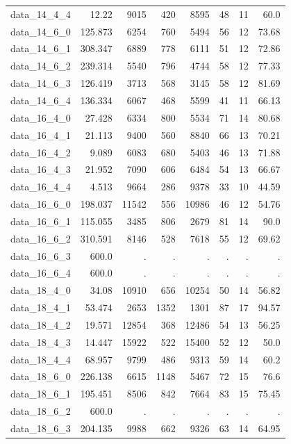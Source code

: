 \documentclass[preprint,12pt,authoryear]{elsarticle}
\begin{document}
\begin{table}[h!]
{\begin{tabular}{rrrrrrrr}
  data\_14\_4\_4 & 12.22 & 9015 & 420 & 8595 & 48 & 11 & 60.0 \\
  data\_14\_6\_0 & 125.873 & 6254 & 760 & 5494 & 56 & 12 & 73.68 \\
  data\_14\_6\_1 & 308.347 & 6889 & 778 & 6111 & 51 & 12 & 72.86 \\
  data\_14\_6\_2 & 239.314 & 5540 & 796 & 4744 & 58 & 12 & 77.33 \\
  data\_14\_6\_3 & 126.419 & 3713 & 568 & 3145 & 58 & 12 & 81.69 \\
  data\_14\_6\_4 & 136.334 & 6067 & 468 & 5599 & 41 & 11 & 66.13 \\
  data\_16\_4\_0 & 27.428 & 6334 & 800 & 5534 & 71 & 14 & 80.68 \\
  data\_16\_4\_1 & 21.113 & 9400 & 560 & 8840 & 66 & 13 & 70.21 \\
  data\_16\_4\_2 & 9.089 & 6083 & 680 & 5403 & 46 & 13 & 71.88 \\
  data\_16\_4\_3 & 21.952 & 7090 & 606 & 6484 & 54 & 13 & 66.67 \\
  data\_16\_4\_4 & 4.513 & 9664 & 286 & 9378 & 33 & 10 & 44.59 \\
  data\_16\_6\_0 & 198.037 & 11542 & 556 & 10986 & 46 & 12 & 54.76 \\
  data\_16\_6\_1 & 115.055 & 3485 & 806 & 2679 & 81 & 14 & 90.0 \\
  data\_16\_6\_2 & 310.591 & 8146 & 528 & 7618 & 55 & 12 & 69.62 \\
  data\_16\_6\_3 & 600.0 & . & . & . & . & . & . \\
  data\_16\_6\_4 & 600.0 & . & . & . & . & . & . \\
  data\_18\_4\_0 & 34.08 & 10910 & 656 & 10254 & 50 & 14 & 56.82 \\
  data\_18\_4\_1 & 53.474 & 2653 & 1352 & 1301 & 87 & 17 & 94.57 \\
  data\_18\_4\_2 & 19.571 & 12854 & 368 & 12486 & 54 & 13 & 56.25 \\
  data\_18\_4\_3 & 14.447 & 15922 & 522 & 15400 & 52 & 12 & 50.0 \\
  data\_18\_4\_4 & 68.957 & 9799 & 486 & 9313 & 59 & 14 & 60.2 \\
  data\_18\_6\_0 & 226.138 & 6615 & 1148 & 5467 & 72 & 15 & 76.6 \\
  data\_18\_6\_1 & 195.451 & 8506 & 842 & 7664 & 83 & 15 & 75.45 \\
  data\_18\_6\_2 & 600.0 & . & . & . & . & . & . \\
  data\_18\_6\_3 & 204.135 & 9988 & 662 & 9326 & 63 & 14 & 64.95 \\

\end{tabular}}
\end{table}
\end{document}
